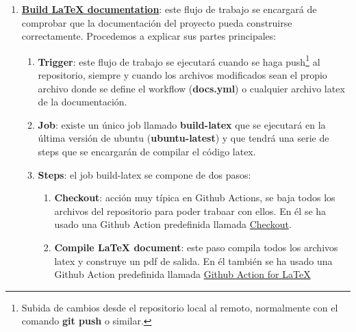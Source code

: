     \begin{enumerate}
        \item \textbf{\href{https://github.com/alexespana/TFG/actions/workflows/docs.yml}
        {Build LaTeX documentation}}: este flujo de trabajo se encargará de comprobar que
        la documentación del proyecto pueda construirse correctamente. Procedemos a
        explicar sus partes principales:
            \begin{enumerate}
                \item \textbf{Trigger}: este flujo de trabajo se ejecutará cuando se haga
                push\footnote{Subida de cambios desde el repositorio local al remoto,
                normalmente con el comando \textbf{git push} o similar.} al repositorio,
                siempre y cuando los archivos modificados sean el propio archivo
                donde se define el workflow (\textbf{docs.yml}) o cualquier archivo latex de
                la documentación.
                \item \textbf{Job}: existe un único job llamado \textbf{build-latex} que se
                ejecutará en la última versión de ubuntu (\textbf{ubuntu-latest}) y que
                tendrá una serie de steps que se encargarán de compilar el código latex.
                \item \textbf{Steps}: el job build-latex se compone de dos pasos:
                    \begin{enumerate}
                        \item \textbf{Checkout}: acción muy típica en Github Actions, se baja
                        todos los archivos del repositorio para poder trabaar con ellos. En
                        él se ha usado una Github Action predefinida llamada
                        \href{https://github.com/marketplace/actions/checkout}{Checkout}.
                        \item \textbf{Compile LaTeX document}: este paso compila todos los
                        archivos latex y construye un pdf de salida. En él también se ha
                        usado una Github Action predefinida llamada
                        \href{https://github.com/marketplace/actions/github-action-for-latex}
                        {Github Action for LaTeX}
                    \end{enumerate}
            \end{enumerate}


\end{enumerate}
